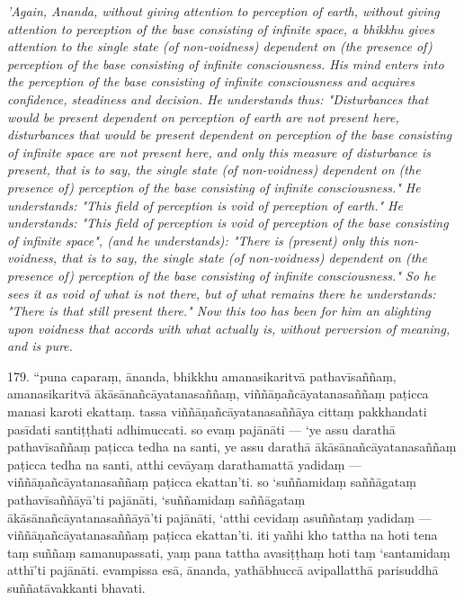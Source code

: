 \documentclass[12pt]{book}
\begin{document}
\begin{paracol}{2}
\begin{column}
{\itshape\footnotesize 'Again, Ananda, without giving attention to perception of earth, without giving attention to perception of the base consisting of infinite space, a bhikkhu gives attention to the single state (of non-voidness) dependent on (the presence of) perception of the base consisting of infinite consciousness. His mind enters into the perception of the base consisting of infinite consciousness and acquires confidence, steadiness and decision. He understands thus: "Disturbances that would be present dependent on perception of earth are not present here, disturbances that would be present dependent on perception of the base consisting of infinite space are not present here, and only this measure of disturbance is present, that is to say, the single state (of non-voidness) dependent on (the presence of) perception of the base consisting of infinite consciousness." He understands: "This field of perception is void of perception of earth." He understands: "This field of perception is void of perception of the base consisting of infinite space", (and he understands): "There is (present) only this non-voidness, that is to say, the single state (of non-voidness) dependent on (the presence of) perception of the base consisting of infinite consciousness." So he sees it as void of what is not there, but of what remains there he understands: "There is that still present there." Now this too has been for him an alighting upon voidness that accords with what actually is, without perversion of meaning, and is pure.}
\switchcolumn
	\begin{flushleft}
179. “puna caparaṃ, ānanda, bhikkhu amanasikaritvā pathavīsaññaṃ, amanasikaritvā ākāsānañcāyatanasaññaṃ, viññāṇañcāyatanasaññaṃ paṭicca manasi karoti ekattaṃ. tassa viññāṇañcāyatanasaññāya cittaṃ pakkhandati pasīdati santiṭṭhati adhimuccati. so evaṃ pajānāti — ‘ye assu darathā pathavīsaññaṃ paṭicca tedha na santi, ye assu darathā ākāsānañcāyatanasaññaṃ paṭicca tedha na santi, atthi cevāyaṃ darathamattā yadidaṃ — viññāṇañcāyatanasaññaṃ paṭicca ekattan’ti. so ‘suññamidaṃ saññāgataṃ pathavīsaññāyā’ti pajānāti, ‘suññamidaṃ saññāgataṃ ākāsānañcāyatanasaññāyā’ti pajānāti, ‘atthi cevidaṃ asuññataṃ yadidaṃ — viññāṇañcāyatanasaññaṃ paṭicca ekattan’ti. iti yañhi kho tattha na hoti tena taṃ suññaṃ samanupassati, yaṃ pana tattha avasiṭṭhaṃ hoti taṃ ‘santamidaṃ atthī’ti pajānāti. evampissa esā, ānanda, yathābhuccā avipallatthā parisuddhā suññatāvakkanti bhavati.
\switchcolumn*
	\end{flushleft}

\end{column}
\end{paracol}
\end{document}
